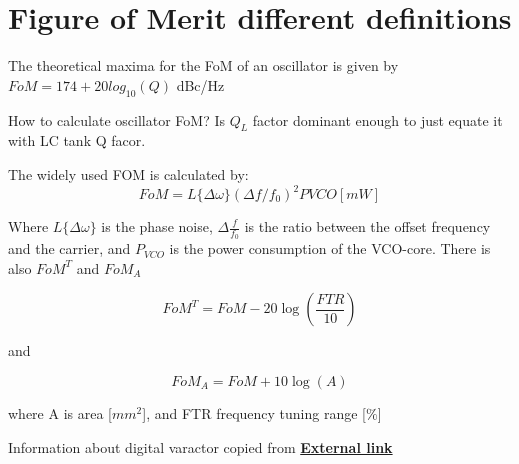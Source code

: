 \documentclass{article}
\begin{document}
\section{Figure of Merit different definitions}

\begin{info} %
	The theoretical maxima for the FoM of an oscillator is given by $FoM=174+20log_{10}(Q)$ dBc/Hz
\end{info}

How to calculate oscillator FoM? Is $Q_L$ factor dominant enough to just equate it with LC tank Q facor.

The widely used FOM is calculated by:
\begin{equation}
	FoM = L\{ \Delta \omega \}( \Delta f/f_0)^2 PVCO [mW]
\end{equation}

Where $L\{\Delta \omega\}$ is the phase noise, $ \Delta \frac{f}{f_0}$ is the ratio between the offset frequency and the carrier, and $P_{VCO}$ is the power consumption of the VCO-core. There is also $FoM^T$ and $FoM_A$ 

\begin{equation}
	FoM^T = FoM - 20 \log (\dfrac{FTR}{10})
\end{equation}

and 

\begin{equation}
	FoM_A = FoM + 10 \log (A)
\end{equation}

where A is area [$mm^2$], and FTR frequency tuning range [$\%$]

Information about digital varactor copied from \href{https://www.doe.carleton.ca/~ddchen/Tutorials/DCO.pdf}{\textbf{External link}}
\end{document}
